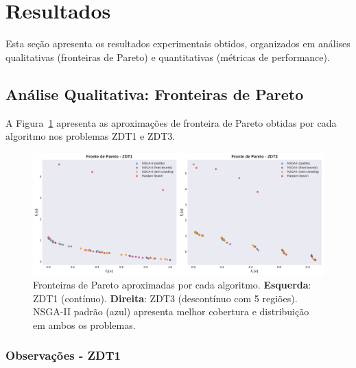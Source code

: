 
\section{Resultados}

Esta seção apresenta os resultados experimentais obtidos, organizados em análises qualitativas (fronteiras de Pareto) e quantitativas (métricas de performance).

\subsection{Análise Qualitativa: Fronteiras de Pareto}

A Figura~\ref{fig:pareto_fronts} apresenta as aproximações de fronteira de Pareto obtidas por cada algoritmo nos problemas ZDT1 e ZDT3.

\begin{figure}[H]
    \centering
    \includegraphics[width=\textwidth]{../plots/A_pareto_fronts.pdf}
    \caption{Fronteiras de Pareto aproximadas por cada algoritmo. \textbf{Esquerda}: ZDT1 (contínuo). \textbf{Direita}: ZDT3 (descontínuo com 5 regiões). NSGA-II padrão (azul) apresenta melhor cobertura e distribuição em ambos os problemas.}
    \label{fig:pareto_fronts}
\end{figure}

\subsubsection{Observações - ZDT1}


